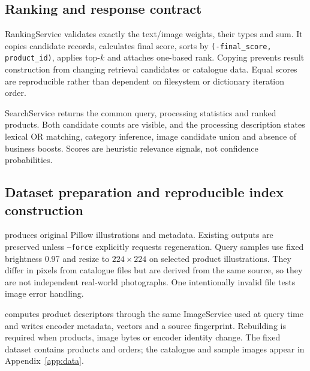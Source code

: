 \documentclass[11pt,a4paper]{article}
\begin{document}
\subsection{Ranking and response contract}
RankingService validates exactly the text/image weights, their types and sum. It copies candidate records, calculates final score, sorts by \texttt{(-final\_score, product\_id)}, applies top-$k$ and attaches one-based rank. Copying prevents result construction from changing retrieval candidates or catalogue data. Equal scores are reproducible rather than dependent on filesystem or dictionary iteration order.

SearchService returns the common query, processing statistics and ranked products. Both candidate counts are visible, and the processing description states lexical OR matching, category inference, image candidate union and absence of business boosts. Scores are heuristic relevance signals, not confidence probabilities.

\subsection{Dataset preparation and reproducible index construction}
 produces original Pillow illustrations and metadata. Existing outputs are preserved unless \texttt{--force} explicitly requests regeneration. Query samples use fixed brightness 0.97 and resize to $224\times224$ on selected product illustrations. They differ in pixels from catalogue files but are derived from the same source, so they are not independent real-world photographs. One intentionally invalid file tests image error handling.

 computes product descriptors through the same ImageService used at query time and writes encoder metadata, vectors and a source fingerprint. Rebuilding is required when products, image bytes or encoder identity change. The fixed dataset contains \ProductCount{} products and \OrderCount{} orders; the catalogue and sample images appear in Appendix~\ref{app:data}.
\end{document}
